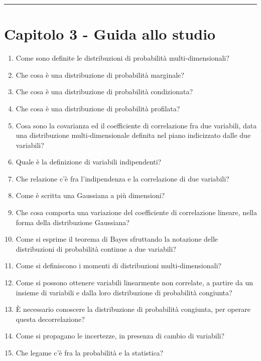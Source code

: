 \vspace{0.05cm}
\par\noindent\rule{\textwidth}{2pt}

\section{Capitolo 3 - Guida allo studio}

\begin{enumerate}
	\item 	Come sono definite le distribuzioni di probabilit\`{a} multi-dimensionali?
	\item Che cosa \`{e} una distribuzione di probabilit\`{a} marginale?
	\item Che cosa \`{e} una distribuzione di probabilit\`{a} condizionata?
	\item Che cosa \`{e} una distribuzione di probabilit\`{a} profilata?
	\item Cosa sono la covarianza ed il coefficiente di correlazione fra due variabili, data una distribuzione multi-dimensionale definita nel piano indicizzato dalle due variabili?
	\item Quale \`{e} la definizione di variabili indipendenti?
	\item Che relazione c'\`{e} fra l'indipendenza e la correlazione di due variabili?
	\item Come \`{e} scritta una Gaussiana a pi\`{u} dimensioni?
	\item Che cosa comporta una variazione del coefficiente di correlazione lineare, nella forma della distribuzione Gaussiana?
	\item Come si esprime il teorema di Bayes sfruttando la notazione delle distribuzioni di probabilit\`{a} continue a due variabili?
	\item Come si definiscono i momenti di distribuzioni multi-dimensionali?
	\item Come si possono ottenere variabili linearmente non correlate, a partire da un insieme di variabili e dalla loro distribuzione di probabilità congiunta?
	\item \`{E} necessario conoscere la distribuzione di probabilit\`{a} congiunta, per operare questa 	decorrelazione?
	\item Come si propagano le incertezze, in presenza di cambio di variabili?
	\item Che legame c'\`{e} fra la probabilit\`{a} e la statistica?

\end{enumerate}
